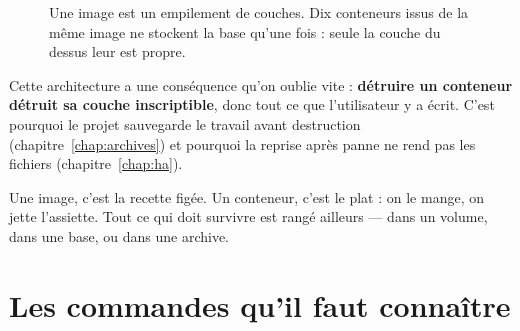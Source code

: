 \begin{figure}[htbp]
\centering
{}
\caption{Une image est un empilement de couches. Dix conteneurs issus de la
même image ne stockent la base qu'une fois : seule la couche du dessus leur est
propre.}
\end{figure}

Cette architecture a une conséquence qu'on oublie vite : \textbf{détruire un
conteneur détruit sa couche inscriptible}, donc tout ce que l'utilisateur y a
écrit. C'est pourquoi le projet sauvegarde le travail avant destruction
(chapitre~\ref{chap:archives}) et pourquoi la reprise après panne ne rend pas
les fichiers (chapitre~\ref{chap:ha}).

\begin{retenir}
Une image, c'est la recette figée. Un conteneur, c'est le plat : on le mange,
on jette l'assiette. Tout ce qui doit survivre est rangé ailleurs --- dans un
volume, dans une base, ou dans une archive.
\end{retenir}

\section{Les commandes qu'il faut connaître}


